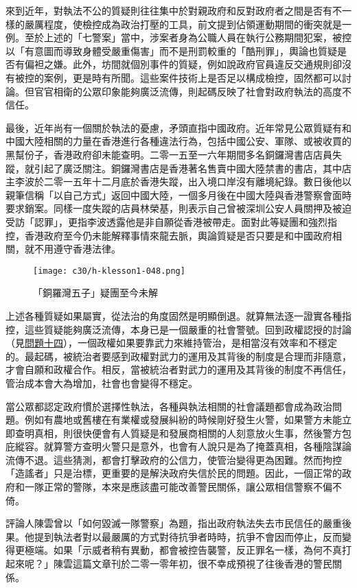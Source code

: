 來到近年，對執法不公的質疑則往往集中於對親政府和反對政府者之間是否有不一樣的嚴厲程度，使檢控成為政治打壓的工具，前文提到佔領運動期間的衝突就是一例。至於上述的「七警案」當中，涉案者身為公職人員在執行公務期間犯案，被控以「有意圖而導致身體受嚴重傷害」而不是刑罰較重的「酷刑罪」，輿論也質疑是否有偏袒之嫌。此外，坊間就個別事件的質疑，例如說政府官員違反交通規則卻沒有被控的案例，更是時有所聞。這些案件技術上是否足以構成檢控，固然都可以討論。但官官相衛的公眾印象能夠廣泛流傳，則起碼反映了社會對政府執法的高度不信任。

最後，近年尚有一個關於執法的憂慮，矛頭直指中國政府。近年常見公眾質疑有和中國大陸相關的力量在香港進行各種違法行為，包括中國公安、軍隊、或被收買的黑幫份子，香港政府卻未能查明。二零一五至一六年期間多名銅鑼灣書店店員失蹤，就引起了廣泛關注。銅鑼灣書店是香港著名售賣中國大陸禁書的書店，其中店主李波於二零一五年十二月底於香港失蹤，出入境口岸沒有離境紀錄。數日後他以親筆信稱「以自己方式」返回中國大陸，一個多月後在中國大陸與香港警察會面時要求銷案。同樣一度失蹤的店員林榮基，則表示自己曾被深圳公安人員關押及被迫受訪「認罪」，更指李波透露他是非自願從香港被帶走。面對此等疑團和強烈指控，香港政府至今仍未能解釋事情來龍去脈，輿論質疑是否只要是和中國政府相關，就不用遵守香港法律。

\begin{figure}[htbp]
    \centering
    \texttt{[image: c30/h-klesson1-048.png]}
    \caption{「銅羅灣五子」疑團至今未解} 
\end{figure}

上述各種質疑如果屬實，從法治的角度固然是明顯倒退。就算無法逐一證實各種指控，這些質疑能夠廣泛流傳，本身已是一個嚴重的社會警號。回到政權認授的討論（見\hyperref[sec:sec14]{問題十四}），一個政權如果要靠武力來維持管治，是相當沒有效率和不穩定的。最起碼，被統治者要感到政權對武力的運用及其背後的制度是合理而非隨意，才會自願和政權合作。相反，當被統治者對武力的運用及其背後的制度不再信任，管治成本會大為增加，社會也會變得不穩定。

當公眾都認定政府慣於選擇性執法，各種與執法相關的社會議題都會成為政治問題。例如有農地或舊樓在有業權或發展糾紛的時候剛好發生火警，如果警方未能立即查明真相，則很快便會有人質疑是和發展商相關的人刻意放火生事，然後警方包庇縱容。就算警方查明火警只是意外，也會有人說只是為了掩蓋真相，各種陰謀論流傳不退。這些猜測，都會打擊政府的公信力，使管治變得更為困難。然而拘控「造謠者」只是治標，更重要的是解決政府失信於民的問題。因此，一個正常的政府和一隊正常的警隊，本來是應該盡可能改善警民關係，讓公眾相信警察不偏不倚。

評論人陳雲曾以「如何毀滅一隊警察」為題，指出政府執法失去市民信任的嚴重後果。他提到執法者對以最嚴厲的方式對待抗爭者時時，抗爭不會因而停止，反而變得更極端。如果「示威者稍有異動，都會被控告襲警，反正罪名一樣，為何不真打起來呢？」陳雲這篇文章刊於二零一零年初，很不幸成預視了往後香港的警民關係。

